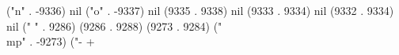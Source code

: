 ("n" . -9336) nil ("o" . -9337) nil (9335 . 9338) nil (9333 . 9334) nil (9332 . 9334) nil ("%
" . 9286) (9286 . 9288) (9273 . 9284) ("\\mp" . -9273) ("-
+
